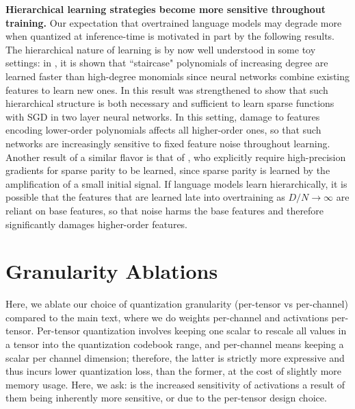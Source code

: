 \documentclass[11pt]{article}
\begin{document}
\textbf{Hierarchical learning strategies become more sensitive throughout training.} Our expectation that overtrained language models may degrade more when quantized at inference-time is motivated in part by the following results. The hierarchical nature of learning is by now well understood in some toy settings: in \citep{abbe2021staircase}, it is shown that ``staircase" polynomials of increasing degree are learned faster than high-degree monomials since neural networks combine existing features to learn new ones. In \citep{abbe2022merged} this result was strengthened to show that such hierarchical structure is both necessary and sufficient to learn sparse functions with SGD in two layer neural networks. In this setting, damage to features encoding lower-order polynomials affects all higher-order ones, so that such networks are increasingly sensitive to fixed feature noise throughout learning. Another result of a similar flavor is that of \citep{barak2022hidden}, who explicitly require high-precision gradients for sparse parity to be learned, since sparse parity is learned by the amplification of a small initial signal. If language models learn hierarchically, it is possible that the features that are learned late into overtraining as $D/N \to \infty$ are reliant on base features, so that noise harms the base features and therefore significantly damages higher-order features. 



\section{Granularity Ablations}

Here, we ablate our choice of quantization granularity (per-tensor vs per-channel) compared to the main text, where we do weights per-channel and activations per-tensor. Per-tensor quantization involves keeping one scalar to rescale all values in a tensor into the quantization codebook range, and per-channel means keeping a scalar per channel dimension; therefore, the latter is strictly more expressive and thus incurs lower quantization loss, than the former, at the cost of slightly more memory usage. Here, we ask: is the increased sensitivity of activations a result of them being inherently more sensitive, or due to the per-tensor design choice. 
\end{document}
